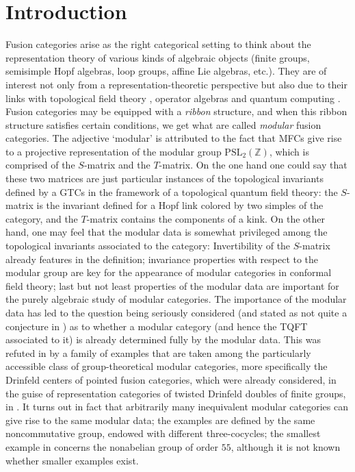 \documentclass[a4paper, 10pt]{book}
\theoremstyle{definition}
\numberwithin{equation}{chapter}
\newcommand\Z{\mathbb Z}
\begin{document}
\chapter{Introduction}\label{intro}
Fusion categories arise as the right categorical setting to think about the representation theory of various kinds of algebraic objects (finite groups, semisimple Hopf algebras, loop groups, affine Lie algebras, etc.). They are of interest not only from a representation-theoretic perspective but also due to their links with topological field theory \cite{T, MR3644796}, operator algebras \cite{MR3367967} and quantum computing \cite{MR2640343}. \\
Fusion categories may be equipped with a \textit{ribbon} structure, and when this ribbon structure satisfies certain conditions, we get what are called \textit{modular} fusion categories. The adjective `modular' is attributed to the fact that MFCs give rise to a projective representation of the modular group $\text{PSL}_2(\Z)$, which is comprised of the $S$-matrix and the $T$-matrix.
On the one hand one could say that these two matrices are just particular instances of the topological invariants defined by a GTCs in the framework of a topological quantum field theory: the $S$-matrix is the invariant defined for a Hopf link colored by two simples of the category, and the $T$-matrix contains the components of a kink. On the other hand, one may feel that the modular data is somewhat privileged among the topological invariants associated to the category: Invertibility of the $S$-matrix already features in the definition; invariance properties with respect to the modular group are key for the appearance of modular categories in conformal field theory; last but not least properties of the modular data are important for the purely algebraic study of modular categories. The importance of the modular data has led to the question being seriously considered (and stated as not quite a conjecture in \cite{MR3486174}) as to whether a modular category (and hence the TQFT associated to it) is already determined fully by the modular data. This was refuted in \cite{2017arXiv170802796M} by a family of examples that are taken among the particularly accessible class of group-theoretical modular categories, more specifically the Drinfeld centers of pointed fusion categories, which were already considered, in the guise of representation categories of twisted Drinfeld doubles of finite groups, in \cite{DijPasRoc:QHAGCOM}. It turns out in fact that arbitrarily many inequivalent modular categories can give rise to the same modular data; the examples are defined by the same noncommutative group, endowed with different three-cocycles; the smallest example in \cite{2017arXiv170802796M} concerns the nonabelian group of order $55$, although it is not known whether smaller examples exist.\\
\end{document}
